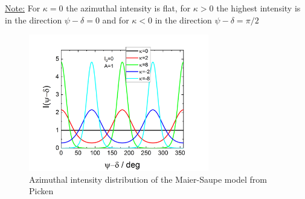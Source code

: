 \noindent \underline{Note:}
For $\kappa=0$ the azimuthal intensity is flat, for $\kappa>0$ the highest intensity is in the direction $\psi-\delta=0$ and for $\kappa<0$ in the direction $\psi-\delta=\pi/2$

\begin{figure}[htb]
\begin{center}
\includegraphics[width=0.7\textwidth]{../images/form_factor/azimuthal/maiersaupe.png}
\end{center}
\caption{Azimuthal intensity distribution of the Maier-Saupe model from Picken \cite{Picken1990}}
\label{fig:maiersaupe}
\end{figure}

\newpage
